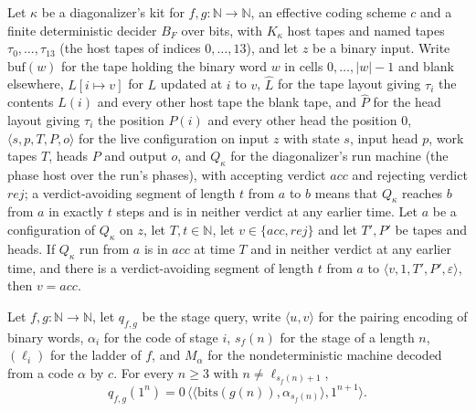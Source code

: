 \begin{theorem}
\end{theorem}

\begin{theorem}
\label{Turing.NTimeDiag.dz_first}
\leanok
{}
Let $\kappa$ be a diagonalizer's kit for $f, g : \mathbb{N} \to \mathbb{N}$, an effective coding scheme $c$ and a finite deterministic decider $B_F$ over bits, with $K_\kappa$ host tapes and named tapes $\tau_0, \dots, \tau_{13}$ (the host tapes of indices $0, \dots, 13$), and let $z$ be a binary input. Write $\mathrm{buf}(w)$ for the tape holding the binary word $w$ in cells $0, \dots, |w| - 1$ and blank elsewhere, $L[i \mapsto v]$ for $L$ updated at $i$ to $v$, $\hat L$ for the tape layout giving $\tau_i$ the contents $L(i)$ and every other host tape the blank tape, and $\hat P$ for the head layout giving $\tau_i$ the position $P(i)$ and every other head the position $0$, $\langle s, p, T, P, o\rangle$ for the live configuration on input $z$ with state $s$, input head $p$, work tapes $T$, heads $P$ and output $o$, and $Q_\kappa$ for the diagonalizer's run machine (the phase host over the run's phases), with accepting verdict $\mathit{acc}$ and rejecting verdict $\mathit{rej}$; a verdict-avoiding segment of length $t$ from $a$ to $b$ means that $Q_\kappa$ reaches $b$ from $a$ in exactly $t$ steps and is in neither verdict at any earlier time. Let $a$ be a configuration of $Q_\kappa$ on $z$, let $T, t \in \mathbb{N}$, let $v \in \{\mathit{acc}, \mathit{rej}\}$ and let $T', P'$ be tapes and heads. If $Q_\kappa$ run from $a$ is in $\mathit{acc}$ at time $T$ and in neither verdict at any earlier time, and there is a verdict-avoiding segment of length $t$ from $a$ to $\langle v, 1, T', P', \varepsilon\rangle$, then $v = \mathit{acc}$.
\end{theorem}

\begin{theorem}
\label{Turing.NTimeDiag.dz_query_mid}
\leanok
{}
Let $f, g : \mathbb{N} \to \mathbb{N}$, let $q_{f,g}$ be the stage query, write $\langle u, v\rangle$ for the pairing encoding of binary words, $\alpha_i$ for the code of stage $i$, $s_f(n)$ for the stage of a length $n$, $(\ell_i)$ for the ladder of $f$, and $M_\alpha$ for the nondeterministic machine decoded from a code $\alpha$ by $c$. For every $n \ge 3$ with $n \ne \ell_{s_f(n) + 1}$, \[ q_{f,g}(1^n) = 0\,\langle\langle \mathrm{bits}(g(n)), \alpha_{s_f(n)}\rangle, 1^{n+1}\rangle. \]
\end{theorem}

